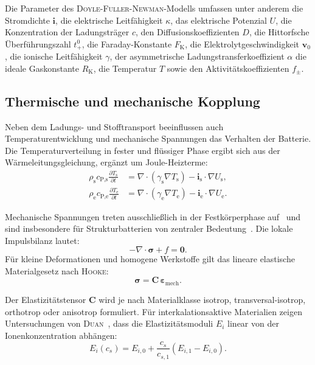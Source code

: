 Die Parameter des \textsc{Doyle}-\textsc{Fuller}-\textsc{Newman}-Modells umfassen unter anderem die Stromdichte $\boldsymbol{i}$, die elektrische Leitfähigkeit $\kappa$, das elektrische Potenzial $U$, die Konzentration der Ladungsträger $c$, den Diffusionskoeffizienten $D$, die Hittorfsche Überführungszahl $t_+^0$, die Faraday-Konstante $F_{\text{K}}$, die Elektrolytgeschwindigkeit $\boldsymbol{v}_0$, die ionische Leitfähigkeit $\gamma$, der asymmetrische Ladungstransferkoeffizient $\alpha$ die ideale Gaskonstante $R_{\text{K}}$, die Temperatur $T$ sowie den Aktivitätskoeffizienten $f_{\pm}$.

\subsection{Thermische und mechanische Kopplung}

Neben dem Ladungs- und Stofftransport beeinflussen auch Temperaturentwicklung und mechanische Spannungen das Verhalten der Batterie. Die Temperaturverteilung in fester und flüssiger Phase ergibt sich aus der Wärmeleitungsgleichung, ergänzt um Joule-Heizterme:
\begin{align}
    \label{eq:micro_thermal_solid}
    \rho_{\text{s}} c_{\text{P,s}} \frac{\partial T_{\text{s}}}{\partial t} &= \nabla \cdot (\gamma_{\text{s}} \nabla T_{\text{s}}) - \boldsymbol{i}_{\text{s}} \cdot \nabla U_{\text{s}},\\
    \label{eq:micro_thermal_liquid}
    \rho_{\text{e}} c_{\text{P,e}} \frac{\partial T_{\text{e}}}{\partial t} &= \nabla \cdot (\gamma_{\text{e}} \nabla T_{\text{e}}) - \boldsymbol{i}_{\text{e}} \cdot \nabla U_{\text{e}}.
\end{align}

Mechanische Spannungen treten ausschließlich in der Festkörperphase auf~\cite{Kaliaperumal2021,Berg2022} und sind insbesondere für Strukturbatterien von zentraler Bedeutung~\cite{Carlstedt2020b}. Die lokale Impulsbilanz lautet:
\begin{equation}\label{eq:stress_gov}
    -\nabla \cdot \boldsymbol{\sigma} + f = \boldsymbol{0}.
\end{equation}
Für kleine Deformationen und homogene Werkstoffe gilt das lineare elastische Materialgesetz nach \textsc{Hooke}:
\begin{equation}\label{eq:stress_material}
    \boldsymbol{\sigma} = \boldsymbol{C}\,\boldsymbol{\varepsilon}_{\text{mech}}.
\end{equation}

Der Elastizitätstensor $\boldsymbol{C}$ wird je nach Materialklasse isotrop, transversal-isotrop, orthotrop oder anisotrop formuliert. Für interkalationsaktive Materialien zeigen Untersuchungen von \textsc{Duan}~\cite{Duan2021}, dass die Elastizitätsmoduli $E_i$ linear von der Ionenkonzentration abhängen:
\begin{equation}
    \label{eq:elastic_modulus_concentration}
    E_i(c_s) = E_{i,0} + \frac{c_s}{c_{s,1}}(E_{i,1} - E_{i,0}).
\end{equation}

